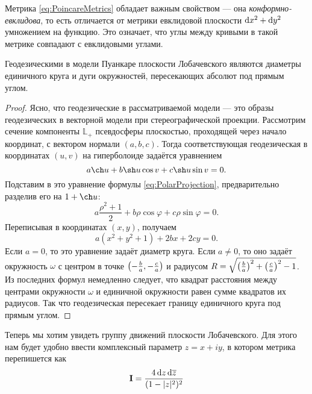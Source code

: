 Метрика \eqref{eq:PoincareMetrics} обладает важным свойством --- она \textit{конформно-евклидова}, то есть отличается от метрики евклидовой плоскости $\mathop{}\!\mathrm{d} x^2 + \mathop{}\!\mathrm{d} y^2$ умножением на функцию. Это означает, что углы между кривыми в такой метрике совпадают с евклидовыми углами.

\begin{theorem}
	Геодезическими в модели Пуанкаре плоскости Лобачевского являются диаметры единичного круга и дуги окружностей, пересекающих абсолют под прямым углом.
\end{theorem}

\begin{proof}
	Ясно, что геодезические в рассматриваемой модели --- это образы геодезических в векторной модели при стереографической проекции. Рассмотрим сечение компоненты $\mathbb{L}_+$ псевдосферы плоскостью, проходящей через начало координат, с вектором нормали $(a, b, c)$. Тогда соответствующая геодезическая в координатах $(u, v)$ на гиперболоиде задаётся уравнением
	\[
		a\ch u + b\sh u\cos v + c\sh u\sin v= 0.
	\]
	Подставим в это уравнение формулы \eqref{eq:PolarProjection}, предварительно разделив его на $1 + \ch u$:
	\[
		a\frac{\rho^2 + 1}{2} + b\rho\cos\varphi + c\rho\sin\varphi = 0.
	\]
	Переписывая в координатах $(x, y)$, получаем
	\[
		a(x^2 + y^2 + 1) + 2bx + 2cy = 0.
	\]
	Если $a = 0$, то это уравнение задаёт диаметр круга. Если $a \ne 0$, то оно задаёт окружность $\omega$ с центром в точке $\left(-\frac{b}{a}, -\frac{c}{a}\right)$ и радиусом $R = \sqrt{\left(\frac{b}{a}\right)^2 + \left(\frac{c}{a}\right)^2 - 1}$. Из последних формул немедленно следует, что квадрат расстояния между центрами окружности $\omega$ и единичной окружности равен сумме квадратов их радиусов. Так что геодезическая пересекает границу единичного круга под прямым углом.
\end{proof}

Теперь мы хотим увидеть группу движений плоскости Лобачевского. Для этого нам будет удобно ввести комплексный параметр $z = x + iy$, в котором метрика перепишется как
\begin{equation} \label{eq:zMetrics}
	\boldsymbol{\operatorname{I}} = \frac{4\mathop{}\!\mathrm{d} z\mathop{}\!\mathrm{d}\overline{z}}{(1 - |z|^2)^2}
\end{equation}

